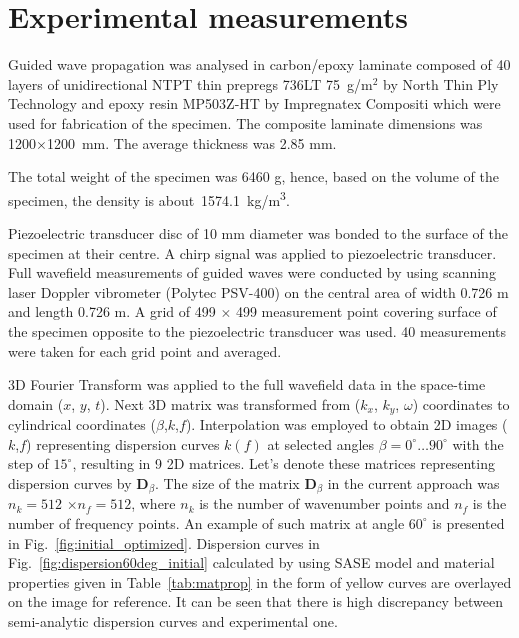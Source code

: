\documentclass[preprint,12pt]{elsarticle}
\newcommand{\matr}[1]{\mathbf{#1}} %
\begin{document}
\section{Experimental measurements \label{sec:experiment}}
Guided wave propagation was analysed in carbon/epoxy laminate composed of 40 layers of unidirectional NTPT thin prepregs 736LT 75~g/m$^2$ by North Thin Ply Technology and epoxy resin MP503Z-HT by Impregnatex Compositi which were used for fabrication of the specimen. The composite laminate dimensions was 1200$\times$1200~mm. The average thickness was 2.85 mm. 

The total weight of the specimen was 6460 g, hence, based on the volume of the specimen, the density is about~1574.1~kg/m\textsuperscript{3}.

Piezoelectric transducer disc of 10 mm diameter  was bonded to the surface of the specimen at their centre. A chirp signal was applied to piezoelectric transducer. Full wavefield measurements of guided waves were conducted by using scanning laser Doppler vibrometer (Polytec PSV-400) on the central area of width 0.726 m and length 0.726 m. A grid of 499 $\times$ 499 measurement point covering surface of the specimen opposite to the piezoelectric transducer was used. 40 measurements were taken for each grid point and averaged.

3D Fourier Transform was applied to the full wavefield data in the space-time domain ($x$, $y$, $t$). Next 3D matrix was transformed from ($k_x$, $k_y$, $\omega$) coordinates to cylindrical coordinates ($\beta$,$k$,$f$). Interpolation was employed to obtain 2D images ($k$,$f$) representing dispersion curves $k(f)$ at selected angles $\beta = 0^{\circ} \ldots 90^{\circ}$ with the step of $15^{\circ}$, resulting in 9 2D matrices. Let's denote these matrices representing dispersion curves by $\matr{D}_{\beta}$. The size of the matrix  $\matr{D}_{\beta}$ in the current approach was $n_k=512$ $\times$$n_f= 512$, where $n_k$ is the number of wavenumber points and $n_f$ is the number of frequency points.  An example of such matrix at angle $ 60^{\circ}$ is presented in Fig.~\ref{fig:initial_optimized}. Dispersion curves in Fig.~\ref{fig:dispersion60deg_initial} calculated by using SASE model and material properties given in Table~\ref{tab:matprop} in the form of yellow curves are overlayed on the image for reference. It can be seen that there is high discrepancy between semi-analytic dispersion curves and experimental one. 
\end{document}
